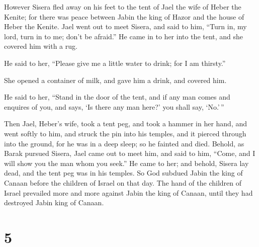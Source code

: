  However Sisera fled away on his feet to the tent of Jael
the wife of Heber the Kenite; for there was peace between Jabin the king
of Hazor and the house of Heber the Kenite.  Jael went out
to meet Sisera, and said to him, ``Turn in, my lord, turn in to me;
don't be afraid.'' He came in to her into the tent, and she covered him
with a rug.

 He said to her, ``Please give me a little water to drink;
for I am thirsty.''

She opened a container of milk, and gave him a drink, and covered him.

 He said to her, ``Stand in the door of the tent, and if
any man comes and enquires of you, and says, `Is there any man here?'
you shall say, `No.'\,''

 Then Jael, Heber's wife, took a tent peg, and took a
hammer in her hand, and went softly to him, and struck the pin into his
temples, and it pierced through into the ground, for he was in a deep
sleep; so he fainted and died.  Behold, as Barak pursued
Sisera, Jael came out to meet him, and said to him, ``Come, and I will
show you the man whom you seek.'' He came to her; and behold, Sisera lay
dead, and the tent peg was in his temples.  So God subdued
Jabin the king of Canaan before the children of Israel on that day.
 The hand of the children of Israel prevailed more and more
against Jabin the king of Canaan, until they had destroyed Jabin king of
Canaan.

\hypertarget{section-4}{%
\section{5}\label{section-4}}

